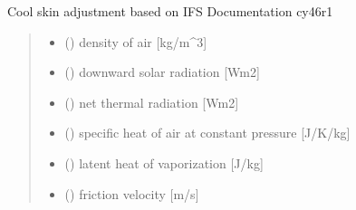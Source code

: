 \documentclass[letterpaper,10pt,english]{sphinxmanual}
\begin{document}
\begin{fulllineitems}
\label{\detokenize{users_guide:AirSeaFluxCode.cs_wl_subs.cs_ecmwf}}
\pysigstartsignatures
\pysiglinewithargsret
{}
{\sphinxparamcomma {}\sphinxparamcomma {}\sphinxparamcomma {}\sphinxparamcomma {}\sphinxparamcomma {}\sphinxparamcomma {}\sphinxparamcomma {}\sphinxparamcomma {}\sphinxparamcomma {}}
{}
\pysigstopsignatures
\sphinxAtStartPar
Cool skin adjustment based on IFS Documentation cy46r1
\begin{quote}\begin{description}
\begin{itemize}
\item {}
\sphinxAtStartPar
{} () \textendash{} density of air               {[}kg/m\textasciicircum{}3{]}

\item {}
\sphinxAtStartPar
{} () \textendash{} downward solar radiation {[}Wm\sphinxhyphen{}2{]}

\item {}
\sphinxAtStartPar
{} () \textendash{} net thermal radiation     {[}Wm\sphinxhyphen{}2{]}

\item {}
\sphinxAtStartPar
{} () \textendash{} specific heat of air at constant pressure {[}J/K/kg{]}

\item {}
\sphinxAtStartPar
{} () \textendash{} latent heat of vaporization   {[}J/kg{]}

\item {}
\sphinxAtStartPar
{} () \textendash{} friction velocity         {[}m/s{]}


\end{itemize}
\end{description}
\end{quote}
\end{fulllineitems}
\end{document}

